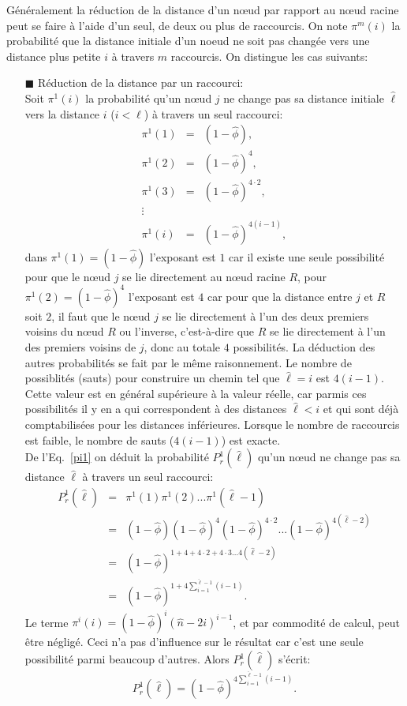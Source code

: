 \noindent Généralement la réduction de la distance d'un nœud par rapport au nœud racine peut se faire à l'aide d'un seul, de deux ou plus de raccourcis. On note $\pi^m(i)$ la probabilité que la distance initiale d'un noeud ne soit pas changée  vers une distance plus petite $i$ à travers $m$ raccourcis. On distingue  les cas suivants:\\
\begin{itemize}
\item[$\blacksquare$]  Réduction de la distance par un raccourci:\\
Soit $\pi^1(i)$ la probabilité qu'un nœud $j$ ne change pas sa distance initiale $\hat{\ell}$ vers
la distance $i$ ($i<\hat{\ell}$) à travers un seul raccourci:
\begin{eqnarray}\nonumber
	\pi^1(1)&=&(1-\hat{\phi}), \\\nonumber
	\pi^1(2)&=&(1-\hat{\phi})^4,\\\nonumber
	\pi^1(3)&=&(1-\hat{\phi})^{4\cdot2},\\\nonumber
	\vdots\\
	\pi^1(i)&=&(1-\hat{\phi})^{4(i-1)},
	\label{pi1}
	\end{eqnarray}
dans $\pi^1(1)=(1-\hat{\phi})$ l'exposant est $1$ car il existe une seule possibilité pour que le nœud $j$ se lie directement au nœud racine $R$, pour $\pi^1(2)=(1-\hat{\phi})^4$  l'exposant est $4$ car pour que la distance entre $j$ et $R$ soit $2$, il faut que le nœud $j$ se lie directement à l'un des deux premiers voisins du nœud $R$ ou l'inverse, c'est-à-dire que $R$ se lie directement à l'un des premiers voisins de $j$, donc au totale $4$ possibilités. La déduction des autres probabilités se fait par le même raisonnement.
Le nombre de possiblités (sauts) pour construire un chemin tel que $\hat{\ell}=i$ est $4(i-1)$. Cette valeur est en général supérieure à la valeur réelle, car parmis ces possibilités il y en a qui correspondent à des distances $\hat{\ell}<i$ et qui sont déjà comptabilisées pour les distances inférieures. Lorsque le nombre de raccourcis est faible, le nombre de sauts ($4(i-1)$) est exacte. \\
De l'Eq.~\eqref{pi1} on déduit la probabilité $P^1_r(\hat{\ell})$ qu'un nœud ne change pas sa distance $\hat{\ell}$ à travers un seul raccourci:
\begin{eqnarray}\nonumber
P_r^1(\hat{\ell})&=&\pi^1(1)\pi^1(2)...\pi^1(\hat{\ell}-1)\\\nonumber
&=& (1-\hat{\phi})(1-\hat{\phi})^4(1-\hat{\phi})^{4\cdot2}...(1-\hat{\phi})^{4(\hat{\ell}-2)}\\\nonumber
&=&(1-\hat{\phi})^{1+4+4\cdot2+4\cdot3...4(\hat{\ell}-2)}\\
&=&(1-\hat{\phi})^{1+4\sum_{i=1}^{\hat{\ell}-1}(i-1)}.
\end{eqnarray}
Le terme  $\pi^i(i)=(1-\hat{\phi})^{i}(\hat{n}-2i)^{i-1}$, et par commodité de calcul, peut être négligé. Ceci  n'a pas d'influence sur le résultat car c'est une seule possibilité parmi beaucoup d'autres. Alors $P_r^1(\hat{\ell})$ s'écrit:
\begin{equation}
P_r^1(\hat{\ell})=(1-\hat{\phi})^{4\sum_{i=1}^{\hat{\ell}-1}(i-1)}.
\end{equation}
	

\end{itemize}
